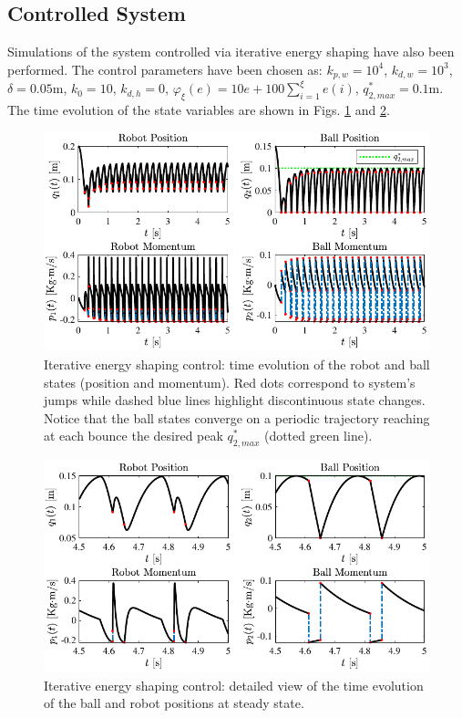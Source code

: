 \subsection{Controlled System}
%
Simulations of the system controlled via iterative energy shaping have also been performed. The control parameters have been chosen as: $k_{p,w} = 10^4$, $k_{d,w} = 10^3$, $\delta = 0.05$m, $k_0 = 10$, $k_{d,h} = 0$, $\varphi_\xi(e) = 10e + 100\sum_{i = 1}^{\xi}e(i)$, $q_{2,max}^* = 0.1$m. The time evolution of the state variables are shown in Figs. \ref{fig:ctrl1} and \ref{fig:ctrl1_det}.
%
\begin{figure}[!h]
	\centering
	\includegraphics[width=\linewidth]{Figures/ctrl1.pdf}
	\caption[Iterative energy shaping control: time evolution of the robot and ball states]{Iterative energy shaping control: time evolution of the robot and ball states (position and momentum). Red dots correspond to system's jumps while dashed blue lines highlight discontinuous state changes. Notice that the ball states converge on a periodic trajectory reaching at each bounce the desired peak $q^*_{2,max}$ (dotted green line).}
	\label{fig:ctrl1}
\end{figure}
%
%
\begin{figure}[!h]
	\centering
	\includegraphics[width=\linewidth]{Figures/ctrl1_det.pdf}
	\caption[Iterative energy shaping control: detailed view of the time evolution of the ball and robot positions at steady state]{Iterative energy shaping control: detailed view of the time evolution of the ball and robot positions at steady state.}
	\label{fig:ctrl1_det}
\end{figure}
